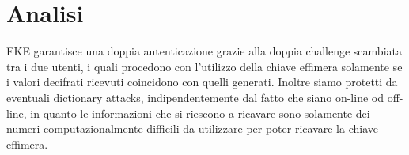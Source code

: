 \documentclass[10pt, letterpaper]{article}
\begin{document}
\section{Analisi}
EKE garantisce una doppia autenticazione grazie alla doppia challenge scambiata
tra i due utenti, i quali procedono con l'utilizzo della chiave effimera
solamente se i valori decifrati ricevuti coincidono con quelli generati.
Inoltre siamo protetti da eventuali dictionary attacks, indipendentemente dal
fatto che siano on-line od off-line, in quanto le informazioni che si riescono a
ricavare sono solamente dei numeri computazionalmente difficili da utilizzare
per poter ricavare la chiave effimera.
\end{document}
